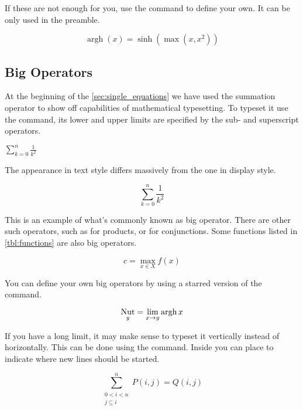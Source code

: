 If these are not enough for you, use the  command to
define your own. It can be only used in the preamble.
\begin{example}[vertical_mode, examplewidth=0.6\linewidth]
\DeclareMathOperator{\argh}{argh}
\[ \argh(x) = \sinh(\max(x, x^2)) \]
\end{example}

\subsection{Big Operators}

At the beginning of the \autoref{sec:single_equations} we have used the
summation operator to show off capabilities of mathematical typesetting. To
typeset it use the  command, its lower and upper limits are specified
by the sub- and superscript operators.
\begin{example}
\(
  \sum_{k=0}^{n} \frac{1}{k^2}
\)
\end{example}
The appearance in text style differs massively from the one in
display style.
\begin{example}
\[
  \sum_{k=0}^{n} \frac{1}{k^2}
\]
\end{example}

This is an example of what's commonly known as big operator. There are other
such operators, such as  for products, or  for
conjunctions. Some functions listed in \autoref{tbl:functions} are also
big operators.
\begin{example}
\[
  c = \max_{x\in X} f(x)
\]
\end{example}

You can define your own big operators by using a starred version of the
 command.
\begin{example}[vertical_mode, examplewidth=0.6\linewidth]
\DeclareMathOperator*{\nut}{Nut}
\[ \nut_y = \lim_{x \to y} \argh{x} \]
\end{example}

If you have a long limit, it may make sense to typeset it vertically instead of
horizontally. This can be done using the  command. Inside you can
place \cs{\bs} to indicate where new lines should be started.
\begin{example}
\[
  \sum^n_{
    \substack{0<i<n \\ 
    j\subseteq i}
  }
   P(i,j) = Q(i,j)
\]
\end{example}


